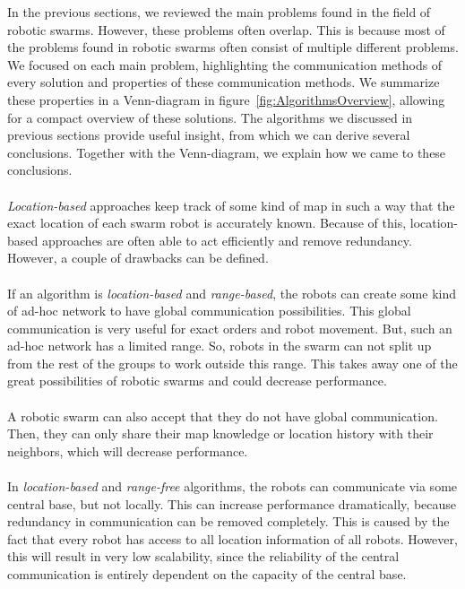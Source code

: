 
In the previous sections, we reviewed the main problems found in the field of robotic swarms. 
However, these problems often overlap.
This is because most of the problems found in robotic swarms often consist of multiple different problems. 
We focused on each main problem, highlighting the communication methods of every solution and properties of these communication methods. 
We summarize these properties in a Venn-diagram in figure~\ref{fig:AlgorithmsOverview}, allowing for a compact overview of these solutions.
The algorithms we discussed in previous sections provide useful insight, from which we can derive several conclusions.
Together with the Venn-diagram, we explain how we came to these conclusions.\\
\\
\emph{Location-based} approaches keep track of some kind of map in such a way that the exact location of each swarm robot is accurately known.
Because of this, location-based approaches are often able to act efficiently and remove redundancy.
However, a couple of drawbacks can be defined.\\
\\
If an algorithm is \emph{location-based} and \emph{range-based}, the robots can create some kind of ad-hoc network to have global communication possibilities.
This global communication is very useful for exact orders and robot movement. 
But, such an ad-hoc network has a limited range. 
So, robots in the swarm can not split up from the rest of the groups to work outside this range. 
This takes away one of the great possibilities of robotic swarms and could decrease performance. \\
\\
A robotic swarm can also accept that they do not have global communication.
Then, they can only share their map knowledge or location history with their neighbors, which will decrease performance.  \\
\\
In \emph{location-based} and \emph{range-free} algorithms, the robots can communicate via some central base, but not locally. 
This can increase performance dramatically, because redundancy in communication can be removed completely.
This is caused by the fact that every robot has access to all location information of all robots.
However, this will result in very low scalability, since the reliability of the central communication is entirely dependent on the capacity of the central base.\\
